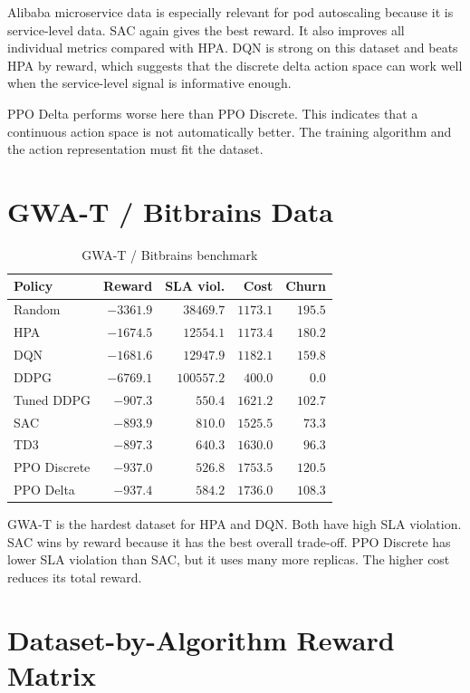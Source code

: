 \documentclass{rapportINPTCLOUD}
\newcommand{\best}[1]{\textbf{#1}}
\begin{document}
Alibaba microservice data is especially relevant for pod autoscaling because it is service-level data. SAC again gives the best reward. It also improves all individual metrics compared with HPA. DQN is strong on this dataset and beats HPA by reward, which suggests that the discrete delta action space can work well when the service-level signal is informative enough.

PPO Delta performs worse here than PPO Discrete. This indicates that a continuous action space is not automatically better. The training algorithm and the action representation must fit the dataset.

\section{GWA-T / Bitbrains Data}

\begin{table}[H]
\centering
\small
\begin{tabular}{lrrrr}
\toprule
\textbf{Policy} & \textbf{Reward} & \textbf{SLA viol.} & \textbf{Cost} & \textbf{Churn} \\
\midrule
Random & $-3361.9$ & $38469.7$ & $1173.1$ & $195.5$ \\
HPA & $-1674.5$ & $12554.1$ & $1173.4$ & $180.2$ \\
DQN & $-1681.6$ & $12947.9$ & $1182.1$ & $159.8$ \\
DDPG & $-6769.1$ & $100557.2$ & $400.0$ & $0.0$ \\
Tuned DDPG & $-907.3$ & $550.4$ & $1621.2$ & $102.7$ \\
SAC & \best{$-893.9$} & $810.0$ & $1525.5$ & $73.3$ \\
TD3 & $-897.3$ & $640.3$ & $1630.0$ & $96.3$ \\
PPO Discrete & $-937.0$ & $526.8$ & $1753.5$ & $120.5$ \\
PPO Delta & $-937.4$ & $584.2$ & $1736.0$ & $108.3$ \\
\bottomrule
\end{tabular}
\caption{GWA-T / Bitbrains benchmark}
\label{tab:gwat}
\end{table}

GWA-T is the hardest dataset for HPA and DQN. Both have high SLA violation. SAC wins by reward because it has the best overall trade-off. PPO Discrete has lower SLA violation than SAC, but it uses many more replicas. The higher cost reduces its total reward.

\section{Dataset-by-Algorithm Reward Matrix}
\end{document}
